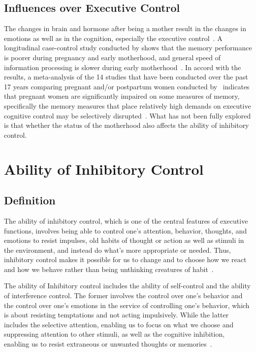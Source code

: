 \subsection{Influences over Executive Control}\label{subsec.overexecutivecontrol}
		
The changes in brain and hormone after being a mother result in the changes in emotions as well as in the cognition, especially the executive control~\citep{jarrahi1969emotional}. A longitudinal case-control study conducted by \citeauthor{de2006differences} shows that the memory performance is poorer during pregnancy and early motherhood, and general speed of information processing is slower during early motherhood~\citep{de2006differences}. In accord with the results, a meta-analysis of the 14 studies that have been conducted over the past 17 years comparing pregnant and/or postpartum women conducted by~\citeauthor{henry2007review} indicates that pregnant women are significantly impaired on some measures of memory, specifically the memory measures that place relatively high demands on executive cognitive control may be selectively disrupted~\citep{henry2007review}. What has not been fully explored is that whether the status of the motherhood also affects the ability of inhibitory control.
			
\section{Ability of Inhibitory Control}\label{sec.abilityofinhibitorycontrol}

\subsection{Definition}\label{subsec.definition}

The ability of inhibitory control, which is one of the central features of executive functions, involves being able to control one's attention, behavior, thoughts, and emotions to resist impulses, old habits of thought or action as well as stimuli in the environment, and instead do what's more appropriate or needed. Thus, inhibitory control makes it possible for us to change and to choose how we react and how we behave rather than being unthinking creatures of habit~\citep{diamond2013executive}.

The ability of Inhibitory control includes the ability of self-control and the ability of interference control. The former involves the control over one's behavior and the control over one's emotions in the service of controlling one's behavior, which is about resisting temptations and not acting impulsively. While the latter includes the selective attention, enabling us to focus on what we choose and suppressing attention to other stimuli, as well as the cognitive inhibition, enabling us to resist extraneous or unwanted thoughts or memories~\citep{diamond2013executive}.

